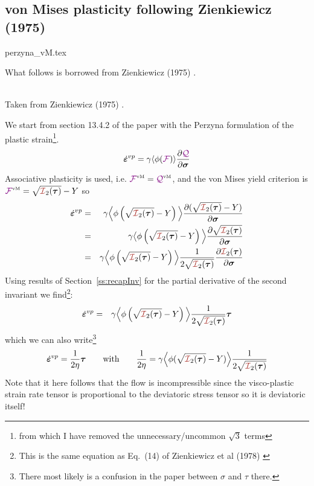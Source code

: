 
\subsection{von Mises plasticity following Zienkiewicz (1975)}
\begin{flushright} {\tiny {\color{gray} perzyna\_vM.tex}} \end{flushright}

What follows is borrowed from Zienkiewicz (1975) \cite{zien75}.

\begin{center}
\\
{\captionfont Taken from Zienkiewicz (1975) \cite{zien75}.}
\end{center}

We start from section 13.4.2 of the paper with the Perzyna formulation of the plastic 
strain\footnote{from which I have removed the unnecessary/uncommon $\sqrt 3$ terms}. 
\[
\dot{\bm \varepsilon}^{vp} = \gamma \langle \phi({{\color{violet}\cal F}}) \rangle \frac{\partial {\color{violet}\cal Q}}{\partial \bm\sigma}
\]
Associative plasticity is used, i.e. ${{\color{violet}\cal F}}^{\text{\tiny vM}}={\cal {\color{violet}\cal Q}}^{\text{\tiny vM}}$, and the von Mises yield
criterion is ${\FFF}^{\text{\tiny vM}}=\sqrt{{\III}_2(\bm \tau)}- Y$ so
\begin{eqnarray}
\dot{\bm \varepsilon}^{vp} 
&=& \gamma \Big\langle \phi\left(\sqrt{{\III}_2(\bm \tau)}- Y\right)  \Big\rangle 
\frac{\partial (\sqrt{{\III}_2(\bm \tau)}- Y)}{\partial \bm\sigma} \nn\\
&=& \gamma \big\langle \phi\left(\sqrt{{\III}_2(\bm \tau)}- Y\right)  \Big\rangle 
\frac{\partial \sqrt{{\III}_2(\bm \tau)}}{\partial \bm\sigma} \nn\\
&=& \gamma \Big\langle \phi\left(\sqrt{{\III}_2(\bm \tau)}- Y\right)  \Big\rangle 
\frac{1}{2 \sqrt{{\III}_2(\bm \tau)}} \frac{\partial {\III}_2(\bm \tau)}{\partial \bm\sigma}
\end{eqnarray}
Using results of Section~\ref{ss:recapInv} for the partial derivative of the second invariant
we find\footnote{This is the same equation as Eq.~(14) of Zienkiewicz et al (1978) \cite{zijo78}}:
\begin{eqnarray}
\dot{\bm \varepsilon}^{vp} 
&=& \gamma \Big\langle \phi\left(\sqrt{{\III}_2(\bm \tau)}- Y \right)  \Big\rangle 
\frac{1}{2 \sqrt{{\III}_2(\bm \tau)}} {\bm \tau}
\end{eqnarray}
which we can also write\footnote{There most likely is a confusion in 
the paper between $\sigma$ and $\tau$ there.}
\[
\dot{\bm \varepsilon}^{vp} =
\frac{1}{2\eta} \bm\tau
\qquad
{\rm with}
\qquad
\frac{1}{2\eta} = \gamma \Big\langle \phi(\sqrt{{\III}_2(\bm \tau)}- Y) \Big\rangle 
\frac{1}{2 \sqrt{{\III}_2(\bm \tau)}}
\]
Note that it here follows that the flow is incompressible since 
the visco-plastic strain rate tensor is proportional to the deviatoric stress tensor
so it is deviatoric itself!

